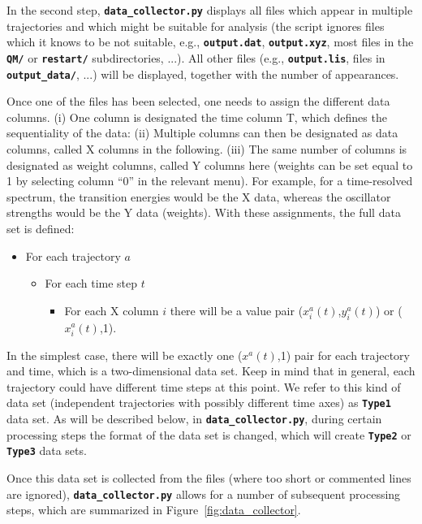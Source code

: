 \documentclass[a4paper,10pt,DIV=15,openany]{scrbook}
\newcommand{\ttt}[1]{\textbf{\texttt{#1}}}
\begin{document}
In the second step, \ttt{data\_collector.py} displays all files which appear in multiple trajectories and which might be suitable for analysis (the script ignores files which it knows to be not suitable, e.g., \ttt{output.dat}, \ttt{output.xyz}, most files in the \ttt{QM/} or \ttt{restart/} subdirectories, ...). 
All other files (e.g., \ttt{output.lis}, files in \ttt{output\_data/}, ...) will be displayed, together with the number of appearances.

Once one of the files has been selected, one needs to assign the different data columns.
(i) One column is designated the time column T, which defines the sequentiality of the data:
(ii) Multiple columns can then be designated as data columns, called X columns in the following.
(iii) The same number of columns is designated as weight columns, called Y columns here (weights can be set equal to 1 by selecting column ``0'' in the relevant menu).
For example, for a time-resolved spectrum, the transition energies would be the X data, whereas the oscillator strengths would be the Y data (weights).
With these assignments, the full data set is defined:
\begin{itemize}
  \item For each trajectory $a$
  \begin{itemize}
    \item For each time step $t$
    \begin{itemize}
      \item For each X column $i$ there will be a value pair ($x^a_i(t)$,$y^a_i(t)$) or ($x^a_i(t)$,1).
    \end{itemize}
  \end{itemize}
\end{itemize}
In the simplest case, there will be exactly one ($x^a(t)$,1) pair for each trajectory and time, which is a two-dimensional data set.
Keep in mind that in general, each trajectory could have different time steps at this point.
We refer to this kind of data set (independent trajectories with possibly different time axes) as \ttt{Type1} data set.
As will be described below, in \ttt{data\_collector.py}, during certain processing steps the format of the data set is changed, which will create \ttt{Type2} or \ttt{Type3} data sets.

Once this data set is collected from the files (where too short or commented lines are ignored), \ttt{data\_collector.py} allows for a number of subsequent processing steps, which are summarized in Figure~\ref{fig:data_collector}.
\end{document}
